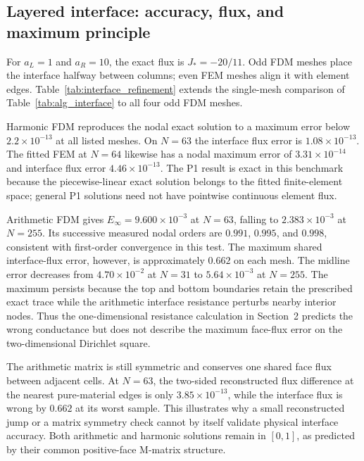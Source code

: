 \subsection{Layered interface: accuracy, flux, and maximum principle}
For $a_L=1$ and $a_R=10$, the exact flux is $J_*=-20/11$. Odd FDM meshes
place the interface halfway between columns; even FEM meshes align it with
element edges. Table~\ref{tab:interface_refinement} extends the single-mesh
comparison of Table~\ref{tab:alg_interface} to all four odd FDM meshes.

\begin{table}[H]
\centering\small

\caption{Independent layered FDM validation at contrast $c=10$.
$E_q^{\max}$ is the maximum error of the shared interface-face flux over the
interior face samples; $E_q^{\mathrm{mid}}$ is the error at the sample nearest
$y=1/2$. The harmonic method's nodal errors are at round-off.}
\label{tab:interface_refinement}
\end{table}

Harmonic FDM reproduces the nodal exact solution to a maximum error below
$2.2\times10^{-13}$ at all listed meshes. On $N=63$ the interface flux error
is $1.08\times10^{-13}$. The fitted FEM at $N=64$ likewise has a nodal
maximum error of $3.31\times10^{-14}$ and interface flux error
$4.46\times10^{-13}$. The P1 result is exact in this benchmark because the
piecewise-linear exact solution belongs to the fitted finite-element space;
general P1 solutions need not have pointwise continuous element flux.

Arithmetic FDM gives $E_\infty=9.600\times10^{-3}$ at $N=63$, falling to
$2.383\times10^{-3}$ at $N=255$. Its successive measured nodal orders are
$0.991$, $0.995$, and $0.998$, consistent with first-order convergence in
this test. The maximum shared interface-flux error, however, is approximately
$0.662$ on each mesh. The midline error decreases from $4.70\times10^{-2}$
at $N=31$ to $5.64\times10^{-3}$ at $N=255$. The maximum persists because
the top and bottom boundaries retain the prescribed exact trace while the
arithmetic interface resistance perturbs nearby interior nodes. Thus the
one-dimensional resistance calculation in Section~2 predicts the wrong
conductance but does not describe the maximum face-flux error on the
two-dimensional Dirichlet square.

The arithmetic matrix is still symmetric and conserves one shared face flux
between adjacent cells. At $N=63$, the two-sided reconstructed flux
difference at the nearest pure-material edges is only
$3.85\times10^{-13}$, while the interface flux is wrong by $0.662$ at its
worst sample. This illustrates why a small reconstructed jump or a matrix
symmetry check cannot by itself validate physical interface accuracy. Both
arithmetic and harmonic solutions remain in $[0,1]$, as predicted by their
common positive-face M-matrix structure.

